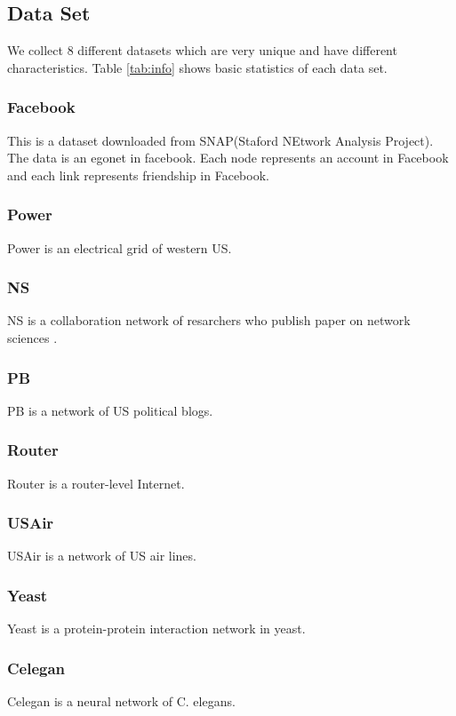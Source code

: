 \documentclass[12pt]{article}
\begin{document}
\subsection {Data Set}
We collect 8 different datasets which are very unique and have different characteristics. Table \ref{tab:info} shows basic statistics of each data set.
\subsubsection{Facebook}
This is a dataset downloaded from SNAP(Staford NEtwork Analysis Project)\cite{snapnets}. The data is an egonet in facebook. Each node represents an account in Facebook and each link represents friendship in Facebook.
\subsubsection{Power}
Power is  an electrical grid of western US\cite{small_world}.
\subsubsection{NS}
NS is a collaboration network of resarchers who publish paper on network sciences \cite{Newman_2006}.
\subsubsection{PB}
PB is a network of US political blogs.\cite{pb}
\subsubsection{Router}
Router is a router-level Internet.\cite{router}
\subsubsection{USAir}
USAir is a network of US air lines. \cite{usair}
\subsubsection{Yeast}
Yeast is a protein-protein interaction network in yeast.\cite{yeast}

\subsubsection{Celegan}
Celegan is a neural network of C. elegans.\cite{small_world}
\end{document}
